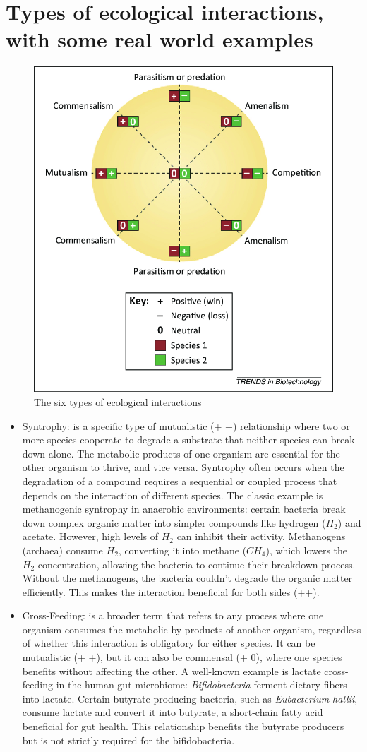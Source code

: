 \section{Types of ecological interactions, with some real world examples}
\begin{figure}[H]
\centering
\includegraphics[width=0.4\linewidth]{figures/chapter_1/Ecological-interactions-among-microbial-species-For-any-two-interacting-species-there.png}
    \caption{The six types of ecological interactions}
    \label{fig:eco_interactions}
\end{figure}
\begin{itemize}
    \item Syntrophy: is a specific type of mutualistic (+ +) relationship where two or more species cooperate to degrade a substrate that neither species can break down alone. The metabolic products of one organism are essential for the other organism to thrive, and vice versa. Syntrophy often occurs when the degradation of a compound requires a sequential or coupled process that depends on the interaction of different species.
	The classic example is methanogenic syntrophy in anaerobic environments: certain bacteria break down complex organic matter into simpler compounds like hydrogen ($H_2$) and acetate. However, high levels of $H_2$ can inhibit their activity. Methanogens (archaea) consume $H_2$, converting it into methane ($CH_4$), which lowers the $H_2$ concentration, allowing the bacteria to continue their breakdown process. Without the methanogens, the bacteria couldn’t degrade the organic matter efficiently. This makes the interaction beneficial for both sides (++). 
	\item Cross-Feeding: is a broader term that refers to any process where one organism consumes the metabolic by-products of another organism, regardless of whether this interaction is obligatory for either species. It can be mutualistic (+ +), but it can also be commensal (+ 0), where one species benefits without affecting the other. A well-known example is lactate cross-feeding in the human gut microbiome: \textit{Bifidobacteria} ferment dietary fibers into lactate. Certain butyrate-producing bacteria, such as \textit{Eubacterium hallii}, consume lactate and convert it into butyrate, a short-chain fatty acid beneficial for gut health. This relationship benefits the butyrate producers but is not strictly required for the bifidobacteria.
\end{itemize}
